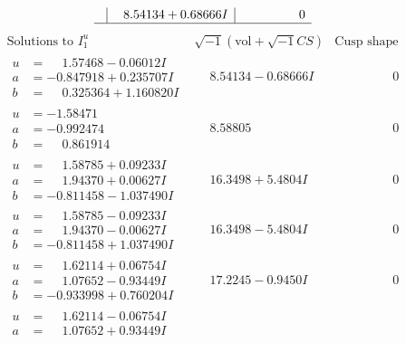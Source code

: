 \documentclass[1p]{elsarticle_modified}
\theoremstyle{definition}
\newcommand{\I}{\sqrt{-1}}
\begin{document}
$$\begin{array}{c|c|c}
 & \phantom{-}8.54134 + 0.68666 I & \phantom{-0.000000 } 0\\
 \hline 
 \end{array}$$\newpage$$\begin{array}{c|c|c}  
\text{Solutions to }I^u_{1}& \I (\text{vol} + \sqrt{-1}CS) & \text{Cusp shape}\\
 \hline 
\begin{aligned}
u &= \phantom{-}1.57468 - 0.06012 I \\
a &= -0.847918 + 0.235707 I \\
b &= \phantom{-}0.325364 + 1.160820 I\end{aligned}
 & \phantom{-}8.54134 - 0.68666 I & \phantom{-0.000000 } 0 \\ \hline\begin{aligned}
u &= -1.58471\phantom{ +0.000000I} \\
a &= -0.992474\phantom{ +0.000000I} \\
b &= \phantom{-}0.861914\phantom{ +0.000000I}\end{aligned}
 & \phantom{-}8.58805\phantom{ +0.000000I} & \phantom{-0.000000 } 0 \\ \hline\begin{aligned}
u &= \phantom{-}1.58785 + 0.09233 I \\
a &= \phantom{-}1.94370 + 0.00627 I \\
b &= -0.811458 - 1.037490 I\end{aligned}
 & \phantom{-}16.3498 + 5.4804 I & \phantom{-0.000000 } 0 \\ \hline\begin{aligned}
u &= \phantom{-}1.58785 - 0.09233 I \\
a &= \phantom{-}1.94370 - 0.00627 I \\
b &= -0.811458 + 1.037490 I\end{aligned}
 & \phantom{-}16.3498 - 5.4804 I & \phantom{-0.000000 } 0 \\ \hline\begin{aligned}
u &= \phantom{-}1.62114 + 0.06754 I \\
a &= \phantom{-}1.07652 - 0.93449 I \\
b &= -0.933998 + 0.760204 I\end{aligned}
 & \phantom{-}17.2245 - 0.9450 I & \phantom{-0.000000 } 0 \\ \hline\begin{aligned}
u &= \phantom{-}1.62114 - 0.06754 I \\
a &= \phantom{-}1.07652 + 0.93449 I \\

\end{aligned}
\end{array}$$
\end{document}
